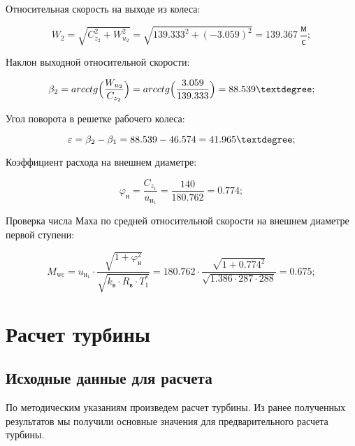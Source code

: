 Относительная скорость на выходе из колеса:

\begin{equation} \label{eu_eqn}
	W_{2}=\sqrt{ C_{z_{2}}^2+W_{u_{2}}^2 }=\sqrt{ 139.333^2+(-3.059)^2 }=139.367 \ \dfrac{\text{м}}{\text{с}};
\end{equation}

Наклон выходной относительной скорости:

\begin{equation} \label{eu_eqn}
	\beta_{2}=arcctg\Bigl( \dfrac{W_{u_{2}}}{C_{z_{2}}} \Bigr)=arcctg\Bigl( \dfrac{3.059}{139.333} \Bigr)=88.539 \textdegree;
\end{equation}

Угол поворота в решетке рабочего колеса:

\begin{equation} \label{eu_eqn}
	\varepsilon= \beta_{2}-\beta_{1}=88.539-46.574=41.965 \textdegree;
\end{equation}

Коэффициент расхода на внешнем диаметре:

\begin{equation} \label{eu_eqn}
	\varphi_{\text{н}}= \dfrac{C_{z_{1}}}{u_{\text{н}_{1}}}=\dfrac{140}{180.762}=0.774;
\end{equation}

Проверка числа Маха по средней относительной скорости на внешнем диаметре первой ступени:

\begin{equation} \label{eu_eqn}
	M_{\text{wc}}=u_{\text{н}_{1}}\cdot \dfrac{\sqrt{ 1+\varphi_{\text{н}}^2 }}{\sqrt{ k_{\text{в}}\cdot R_{\text{в}}\cdot T_{1}^* }}= 180.762\cdot \dfrac{\sqrt{ 1+0.774^2 }}{\sqrt{ 1.386\cdot 287\cdot 288 }}=0.675;
\end{equation}


\section{Расчет турбины}
\subsection{Исходные данные для расчета}

По методическим указаниям \cite{TURB} произведем расчет турбины. Из ранее полученных результатов мы получили основные значения для предварительного расчета турбины.

